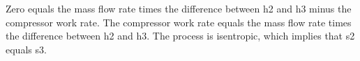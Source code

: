 Zero equals the mass flow rate times the difference between h2 and h3 minus the compressor work rate. The compressor work rate equals the mass flow rate times the difference between h2 and h3. The process is isentropic, which implies that s2 equals s3.